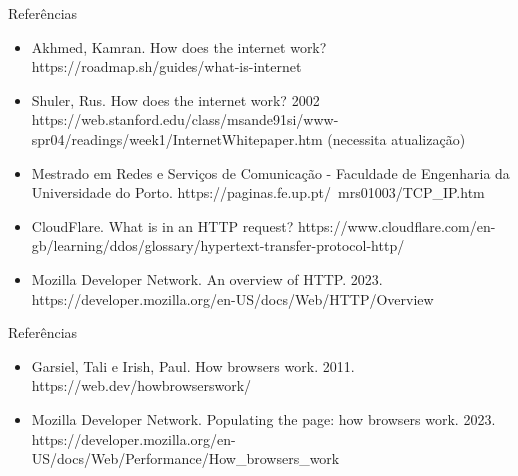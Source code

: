 \documentclass[11pt]{beamer}
\begin{document}
    \begin{frame}{Referências}
      \begin{itemize}
        \item Akhmed, Kamran. How does the internet work? https://roadmap.sh/guides/what-is-internet
        \item Shuler, Rus. How does the internet work? 2002 https://web.stanford.edu/class/msande91si/www-spr04/readings/week1/InternetWhitepaper.htm (necessita atualização)
        \item Mestrado em Redes e Serviços de Comunicação - Faculdade de Engenharia da Universidade do Porto. https://paginas.fe.up.pt/~mrs01003/TCP\_IP.htm
        \item CloudFlare. What is in an HTTP request? https://www.cloudflare.com/en-gb/learning/ddos/glossary/hypertext-transfer-protocol-http/
        \item Mozilla Developer Network. An overview of HTTP. 2023. https://developer.mozilla.org/en-US/docs/Web/HTTP/Overview
      \end{itemize}
    \end{frame}

    \begin{frame}{Referências}
      \begin{itemize}
        \item Garsiel, Tali e Irish, Paul. How browsers work. 2011. https://web.dev/howbrowserswork/
        \item Mozilla Developer Network. Populating the page: how browsers work. 2023. https://developer.mozilla.org/en-US/docs/Web/Performance/How\_browsers\_work
      \end{itemize}
    \end{frame}
\end{document}
